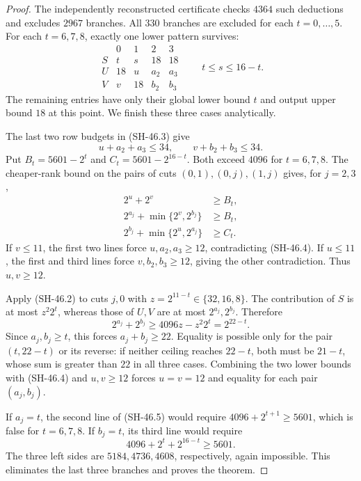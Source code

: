 \begin{proof}
The independently reconstructed certificate checks
$4364$ such deductions and excludes $2967$ branches.
All $330$ branches are excluded for each $t=0,\ldots,5$.
For each $t=6,7,8$, exactly one lower pattern survives:
\[
\begin{array}{c|cccc}
 &0&1&2&3\\\hline
S&t&s&18&18\\
U&18&u&a_2&a_3\\
V&v&18&b_2&b_3
\end{array}
\qquad t\le s\le16-t.                         \tag{SH-46.3}
\]
The remaining entries have only their global
lower bound $t$ and output upper bound $18$ at
this point.  We finish these three cases analytically.

The last two row budgets in (SH-46.3) give
\[
 u+a_2+a_3\le34,\qquad v+b_2+b_3\le34.
                                                        \tag{SH-46.4}
\]
Put $B_t=5601-2^t$ and $C_t=5601-2^{16-t}$.
Both exceed $4096$ for $t=6,7,8$.
The cheaper-rank bound on the pairs of cuts
$(0,1),(0,j),(1,j)$ gives, for $j=2,3$,
\begin{align}
 2^u+2^v&\ge B_t,\nonumber\\
 2^{a_j}+\min\{2^v,2^{b_j}\}&\ge B_t,\nonumber\\
 2^{b_j}+\min\{2^u,2^{a_j}\}&\ge C_t.
                                                    \tag{SH-46.5}
\end{align}
If $v\le11$, the first two lines force
$u,a_2,a_3\ge12$, contradicting (SH-46.4).
If $u\le11$, the first and third lines force
$v,b_2,b_3\ge12$, giving the other contradiction.
Thus $u,v\ge12$.

Apply (SH-46.2) to cuts $j,0$ with
$z=2^{11-t}\in\{32,16,8\}$.  The contribution
of $S$ is at most $z^2 2^t$, whereas those of
$U,V$ are at most $2^{a_j},2^{b_j}$.  Therefore
\[
 2^{a_j}+2^{b_j}
 \ge4096z-z^2 2^t=2^{22-t}.                    \tag{SH-46.6}
\]
Since $a_j,b_j\ge t$, this forces
$a_j+b_j\ge22$.  Equality is possible only for
the pair $(t,22-t)$ or its reverse: if neither
ceiling reaches $22-t$, both must be $21-t$,
whose sum is greater than $22$ in all three cases.
Combining the two lower bounds with (SH-46.4)
and $u,v\ge12$ forces $u=v=12$ and equality
for each pair $(a_j,b_j)$.

If $a_j=t$, the second line of (SH-46.5) would
require $4096+2^{t+1}\ge5601$, which is false
for $t=6,7,8$.  If $b_j=t$, its third line
would require
\[
 4096+2^t+2^{16-t}\ge5601.
\]
The three left sides are $5184,4736,4608$,
respectively, again impossible.  This eliminates
the last three branches and proves the theorem.
\end{proof}

